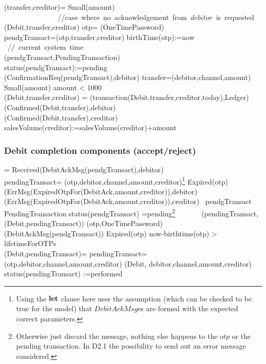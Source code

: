  \begin{asm}
 (transfer,creditor)=\+
 \IF Small(amount) 
 \mbox{ ~~~~~~~~~~~~~  //case where no acknowledgement from $debitor$ is requested}\+
 \THEN ~ (Debit,transfer,creditor) \-
 \ELSE \+
 \LET otp= \NEW(OneTimePassword)\\
 \LET pendgTransact=(otp,transfer,creditor)\+
 birthTime(otp):=now \mbox{ // current system time}\\
 (pendgTransact,PendingTransaction)\\ 
 status(pendgTransact):=pending \\
 (ConfirmationReq(pendgTransact),\TO debitor)
 \dec\-
 \WHERE \+
 transfer=(debitor,channel,amount)\\
 Small(amount) \IFF amount < 1000 \\
 (Debit,transfer,creditor) =\+     
 (transaction(Debit,transfer,creditor,today),Ledger)\\
 (Confirmed(Debit,transfer),\TO debitor)\\
 (Confirmed(Debit,transfer),\TO creditor)\\
 salesVolume(creditor):=salesVolume(creditor)+amount
 \end{asm}
 
 \subsubsection{Debit completion components (accept/reject)}
 
 
 
 \begin{asm}  
  =\+           
 \IF Received(DebitAckMsg(pendgTransact),\FROM debitor) \THEN \\
 \LET pendingTransact= (otp,debitor,channel,amount,creditor)\footnote{Using the $\mathrel{\mathbf{let}}$ clause here uses the assumption (which can be checked to be true for the model) that $DebitAckMsg$es are formed with the expected correct parameters.}\+
 \IF Expired(otp) \THEN \+
 (ErrMsg(ExpiredOtpFor(DebitAck,amount,creditor)),\TO debitor) \\
 (ErrMsg(ExpiredOtpFor(DebitAck,amount,creditor)),\TO creditor)\- 
 \ELSE ~\IF pendgTransact  \in PendingTransaction \AND
 status(pendgTransact) =pending\footnote{Otherwise just discard the message, nothing else happens to the $otp$ or the pending transaction. In D2.1 the possibility to send out an error message considered.}  \+
 \THEN \+
 \+
 ~~~~~~ (pendingTransact,(Debit,pendingTransact))\-
 (otp,OneTimePassword)\dec\dec\-  
 (DebitAckMsg(pendgTransact)) \dec\-
 \WHERE \+
 Expired(otp) \IFF now-birthtime(otp) > lifetimeForOTPs\\
 (Debit,pendingTransact)=\+
 \LET pendingTransact=(otp,debitor,channel,amount,creditor)\+
 (Debit, debitor,channel,amount,creditor)\\
 status(pendingTransact) :=performed
 \end{asm}
 
